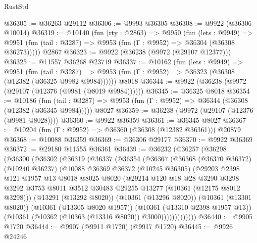 \begin{lexlean}{RustStd}
\begin{coremodule}
@36305 := @36263 @29112
@36306 := @9993 @36305
@36308 := @9922 (@36306 @10014)
@36319 := @10140
    (fun (rty : @2863) =>
    @9950
      (fun (lets : @9949) =>
      @9951 (fun (tail : @3287) => @9953 (fun (Γ : @9952) => @36304 (@36308 @36273)))))
    @2867
@36323 := @9922 (@36238 (@9972 (@29107 @12377)))
@36325 := @11557 @36268 @23719
@36337 := @10162
    (fun (lets : @9949) =>
    @9951
      (fun (tail : @3287) =>
      @9953 (fun (Γ : @9952) => @36323 (@36308 (@12382 (@36325 @9982 @9984))))))
    @8018
@36344 := @9922 (@36238 (@9972 (@29107 (@12376 (@9981 (@8019 @9984))))))
@36345 := @36325 @8018
@36354 := @10186
    (fun (tail : @3287) => @9953 (fun (Γ : @9952) => @36344 (@36308 (@12382 (@36345 @9984)))))
    @8027
@36359 := @36238 (@9972 (@29107 (@12376 (@9981 @8028))))
@36360 := @9922 @36359
@36361 := @36345 @8027
@36367 := @10204 (fun (Γ : @9952) => @36360 (@36308 (@12382 @36361))) @20879
@36368 := @10088 @36359
@36369 := @36306 @29177
@36370 := @9922 @36369
@36372 := @29180 @11555 @36361
@36439 := @36232
    (@36257
      (@36298
        (@36300
          (@36302
            (@36319
              (@36337
                (@36354
                  (@36367
                    (@36368
                      (@36370 @36372)
                      (@10240 @36237)
                      (@10088
                        @36369
                        @36372
                        (@10245 @36305)
                        (@29203
                          @2398
                          @121
                          @1957
                          @13
                          @8018
                          @8025
                          @8020
                          (@29214
                            @120
                            @18
                            @28
                            @3290
                            @3298
                            @3292
                            @3753
                            @8011
                            @3512
                            @30483
                            @29255
                            @13277
                            (@10361 (@12175 @8012 @3298)))
                          (@13291 (@13292 @8020))
                          (@10361 (@13296 @8020))
                          (@10361 (@13301 @8020))
                          (@10361 (@13305 @8020 @1957))
                          (@10361 (@13310 @2398 @1957 @13))
                          (@10361 (@10362 (@10363 (@13316 @8020)) @3000)))))))))))))
@36440 := @9905 @1720
@36444 := @9907 (@9911 @1720) (@9917 @1720)
@36445 := @9926 @24246

\end{coremodule}
\end{lexlean}
